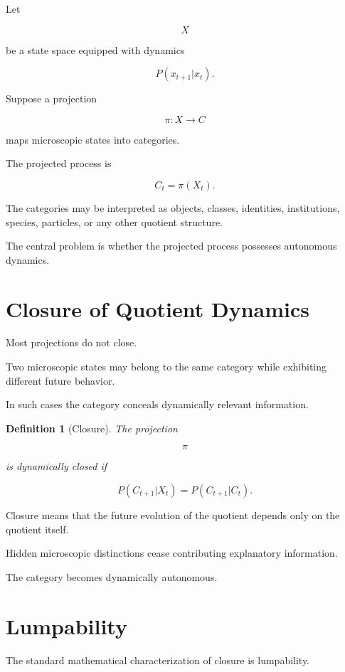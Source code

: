 \documentclass[11pt,oneside,openany]{book}
\newtheorem{definition}{Definition}[chapter] \newtheorem{theorem}{Theorem}[chapter] \newtheorem{proposition}{Proposition}[chapter] \newtheorem{lemma}{Lemma}[chapter] \newtheorem{corollary}{Corollary}[chapter] \newtheorem{remark}{Remark}[chapter]
\begin{document}
Let

\[
X
\]

be a state space equipped with dynamics

\[
P(x_{t+1}|x_t).
\]

Suppose a projection

\[
\pi:X\rightarrow C
\]

maps microscopic states into categories.

The projected process is

\[
C_t=\pi(X_t).
\]

The categories may be interpreted as objects, classes, identities, institutions, species, particles, or any other quotient structure.

The central problem is whether the projected process possesses autonomous dynamics.

\section{Closure of Quotient Dynamics}

Most projections do not close.

Two microscopic states may belong to the same category while exhibiting different future behavior.

In such cases the category conceals dynamically relevant information.

\begin{definition}[Closure]

The projection

\[
\pi
\]

is dynamically closed if

\[
P(C_{t+1}|X_t)
=
P(C_{t+1}|C_t).
\]

\end{definition}

Closure means that the future evolution of the quotient depends only on the quotient itself.

Hidden microscopic distinctions cease contributing explanatory information.

The category becomes dynamically autonomous.

\section{Lumpability}

The standard mathematical characterization of closure is lumpability.
\end{document}
